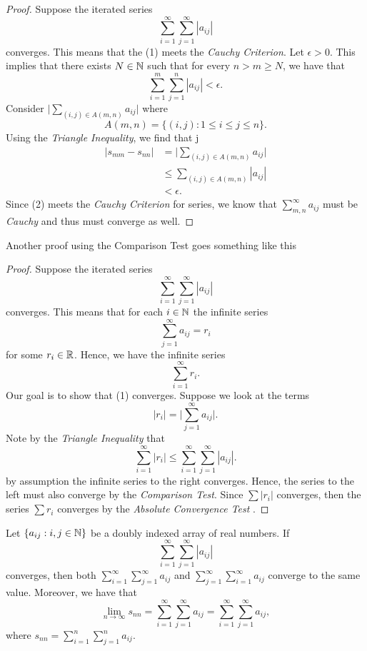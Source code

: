 \begin{proof}
Suppose the iterated series 
\[ \sum_{i=1}^{\infty} \sum_{j=1}^{\infty} |a_{ij}|  \tag{1}\]
converges. This means that the (1) meets the \textit{Cauchy Criterion}. Let \(\epsilon > 0 \). This implies that there exists \( N \in \mathbb{N} \) such that for every \( n > m  \geq N \), we have that 
\[ \sum_{i= 1}^{m} \sum_{j= 1}^{n} |a_{ij}| < \epsilon.\]
Consider \( \Big| \sum_{(i,j) \in A(m,n)} a_{ij} \Big|\) where 
\[  A(m,n) = \{ (i,j) : 1 \leq i \leq j \leq n \}.  \] Using the \textit{Triangle Inequality}, we find that  
j\begin{align*}
    \Big| s_{m m} - s_{nn} \Big| &= \Big| \sum_{ (i,j) \in A(m,n)} a_{ij} \Big| \\ 
                                 &\leq \sum_{(i,j) \in A(m,n)} | a_{ij} | \tag{2}\\                          &< \epsilon.
\end{align*}
Since (2) meets the \textit{Cauchy Criterion} for series, we know that \( \sum_{ m,n }^{ \infty  } a_{ij} \) must be \textit{Cauchy} and thus must converge as well. 
\end{proof}

Another proof using the Comparison Test goes something like this

\begin{proof}
    Suppose the iterated series 
    \[ \sum_{i=1}^{\infty} \sum_{j=1}^{\infty} |a_{ij}| \]
    converges. This means that for each \( i \in \mathbb{N} \) the infinite series 
    \[ \sum_{j=1}^{\infty} a_{ij} = r_i \] for some \( r_i \in \mathbb{R} \). Hence, we have the infinite series 
    \[ \sum_{i=1}^{\infty} r_i. \tag{1} \]
    Our goal is to show that (1) converges. Suppose we look at the terms 
    \[ |r_i| = \Big| \sum_{j=1}^{\infty} a_{ij}\Big|.\]
    Note by the \textit{Triangle Inequality} that 
    \[ \sum_{i=1}^{\infty} |r_i| \leq \sum_{i=1}^{\infty} \sum_{j=1}^{\infty} |a_{ij}|.  \]
    by assumption the infinite series to the right converges. Hence, the series to the left must also converge by the \textit{Comparison Test}. Since \( \sum |r_i|\) converges, then the series 
    \( \sum r_i \) converges by the \textit{ Absolute Convergence Test }. 
\end{proof}

\begin{theorem}{}{}
    Let \( \{ a_{ij} : i,j \in \mathbb{N}  \}\) be a doubly indexed array of real numbers. If 
    \[ \sum_{i=1}^{\infty} \sum_{j=1}^{\infty} |a_{ij}|\]
    converges, then both \( \sum_{i=1}^{\infty} \sum_{ j=1 }^{ \infty  }  a_{ij}\) and \( \sum_{j=1}^{\infty} \sum_{i=1}^{\infty} a_{ij} \) converge to the same value. Moreover, we have that 
    \[ \lim_{n \to \infty} s_{nn} = \sum_{i=1}^{\infty} \sum_{j=1}^{\infty} a_{ij} = \sum_{i=1}^{\infty} \sum_{j=1}^{\infty} a_{ij},\]
    where \( s_{nn} = \sum_{i=1}^{n} \sum_{j=1}^{n} a_{ij}\). 
\end{theorem}

